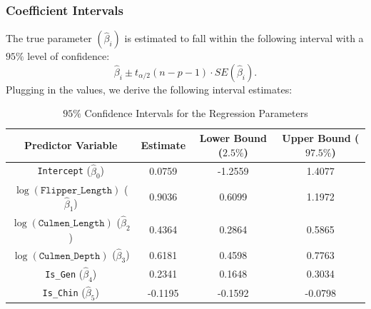 \documentclass[12pt]{article}
\begin{document}
\subsubsection{Coefficient Intervals}
The true parameter $(\hat{\beta}_i)$ is estimated to fall
within the following interval with a $95\%$ level of confidence:
\[
  \hat{\beta}_i \pm t_{{\alpha}/{2}}(n-p-1)\cdot SE(\hat{\beta}_i)
.\]
Plugging in the values, we derive the following interval estimates:
\begin{table}[H]
  \centering
  \begin{tabular}{|| c | c | c c ||}
    \hline
    \textbf{Predictor Variable}
    & \textbf{Estimate}
    & \textbf{Lower Bound ($2.5\%$)}
    & \textbf{Upper Bound ($97.5\%$)} \\[0.5ex]
    \hline\hline
    \texttt{Intercept} ($\hat{\beta}_0$) & 0.0759 & -1.2559 & 1.4077 \\
    $\log(\texttt{Flipper\_Length})$ ($\hat{\beta}_1$) & 0.9036 &
    0.6099 & 1.1972 \\
    $\log(\texttt{Culmen\_Length})$ ($\hat{\beta}_2$) & 0.4364 &
    0.2864 & 0.5865 \\
    $\log(\texttt{Culmen\_Depth})$ ($\hat{\beta}_3$) & 0.6181 &
    0.4598 & 0.7763 \\
    \texttt{Is\_Gen} ($\hat{\beta}_4$) & 0.2341 & 0.1648 & 0.3034 \\
    \texttt{Is\_Chin} ($\hat{\beta}_5$) & -0.1195 & -0.1592 & -0.0798 \\
    \hline
  \end{tabular}
  \caption{$95\%$ Confidence Intervals for the Regression Parameters}
\end{table}
\end{document}
